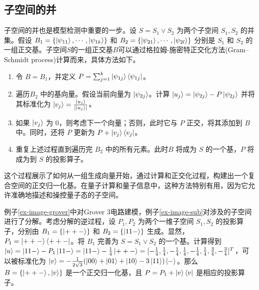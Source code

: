 \subsection*{子空间的并}
子空间的并也是模型检测中重要的一步。设 $S=S_1\vee S_2$ 为两个子空间 $S_1,S_2$ 的并集。假设 $B_1=\{\ket{\psi_{11}},\cdots,\ket{\psi_{1k}}\}$ 和 $B_2=\{\ket{\psi_{21}},\cdots,\ket{\psi_{2l}}\}$ 分别是 $S_1$ 和 $S_2$ 的一组正交基。子空间$S$的一组正交基$B$可以通过格拉姆-施密特正交化方法(Gram–Schmidt process)计算而来，具体方法如下。
\begin{enumerate}
    \item 令 $B=B_1$，并定义 $P=\sum_{j=1}^{k}{\ket{\psi_{1j}}\bra{\psi_{1j}}}$。
    \item 遍历$B_2$ 中的基向量。假设当前向量为 $\ket{\psi_{2j}}$。计算 $\ket{u_j}=\ket{\psi_{2j}}-P\ket{\psi_{2j}}$ 并将其标准化为 $\ket{v_j}=\frac{\ket{u_j}}{|\ket{u_j}|}$。
    \item 如果 $\ket{v_j}$ 为 0，则考虑下一个向量；否则，此时它与 $P$ 正交，将其添加到 $B$ 中。同时，还将 $P$ 更新为 $P+\ket{v_j}\bra{v_j}$。
    \item 重复上述过程直到遍历完 $B_2$ 中的所有元素。此时$B$ 将成为 $S$ 的一个基，$P$ 将成为到 $S$ 的投影算子。
\end{enumerate}

这个过程展示了如何从一组生成向量开始，通过计算和正交化过程，构建出一个复合空间的正交归一化基。在量子计算和量子信息中，这种方法特别有用，因为它允许准确地描述和操控量子态的子空间。

\begin{example}
    例子\ref{ex-image-grover}中对Grover 3电路建模，例子\ref{ex-image-sub}对涉及的子空间进行了分解。考虑分解的逆过程，设 $P_1,P_2$ 为两个一维子空间 $S_1,S_2$ 的投影算子，分别由 $B_1=\{\ket{++-}\}$ 和 $B_2=\{\ket{11-}\}$ 生成。显然，$P_1=\ket{++-}\bra{++-}$。将 $B_1$ 完善为 $S=S_1\vee S_2$ 的一个基。计算得到$\ket{u}=\ket{11-}-P_1\ket{11-}=\ket{11-}-\frac{1}{4}\ket{++-}=[-\frac{1}{4},\frac{1}{4},-\frac{1}{4},\frac{1}{4},-\frac{1}{4},\frac{1}{4},\frac{3}{4},-\frac{3}{4}]^T$，可以被标准化为 $\ket{v}=-\frac{1}{2\sqrt{3}}(\ket{00}+\ket{01}+\ket{10}-3\ket{11})\ket{-}$。那么 $B=\{\ket{++-},\ket{v}\}$ 是一个正交归一化基，且 $P=P_1+\ket{v}\bra{v}$ 是相应的投影算子。
\end{example}
